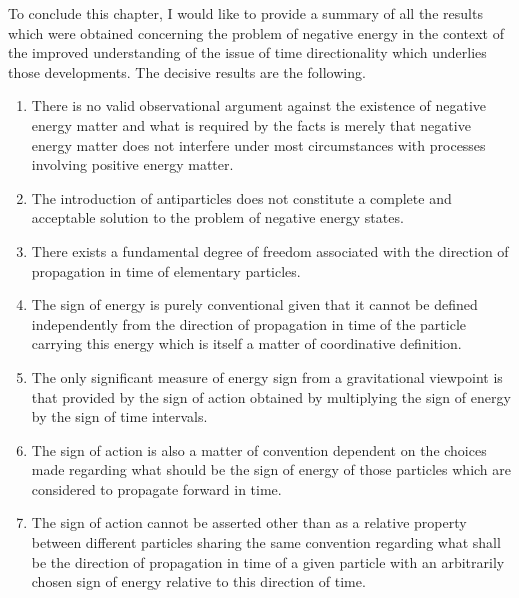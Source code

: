 \documentclass[notitlepage,12pt]{report}
\begin{document}
To conclude this chapter, I would like to provide a summary of all the results which were obtained concerning the problem of negative energy in the context of the improved understanding of the issue of time directionality which underlies those developments. The decisive results are the following.

\begin{enumerate}

\item There is no valid observational argument against the existence of negative energy matter and what is required by the facts is merely that negative energy matter does not interfere under most circumstances with processes involving positive energy matter.

\item The introduction of antiparticles does not constitute a complete and acceptable solution to the problem of negative energy states.

\item There exists a fundamental degree of freedom associated with the direction of propagation in time of elementary particles.

\item The sign of energy is purely conventional given that it cannot be defined independently from the direction of propagation in time of the particle carrying this energy which is itself a matter of coordinative definition.

\item The only significant measure of energy sign from a gravitational viewpoint is that provided by the sign of action obtained by multiplying the sign of energy by the sign of time intervals.

\item The sign of action is also a matter of convention dependent on the choices made regarding what should be the sign of energy of those particles which are considered to propagate forward in time.

\item The sign of action cannot be asserted other than as a relative property between different particles sharing the same convention regarding what shall be the direction of propagation in time of a given particle with an arbitrarily chosen sign of energy relative to this direction of time.


\end{enumerate}
\end{document}
